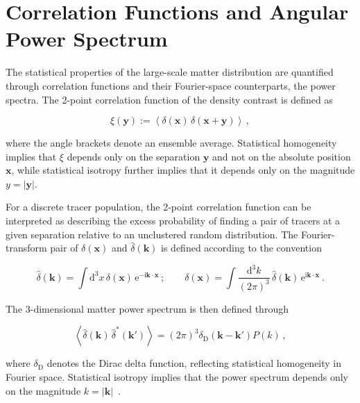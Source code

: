 \section{Correlation Functions and Angular Power Spectrum}\label{sec:correlation_functions}
The statistical properties of the large-scale matter distribution are quantified through 
correlation functions and their Fourier-space counterparts, the power spectra. 
The 2-point correlation function of the density contrast
is defined as

\begin{equation}
    \xi(\mathbf{y})
    := \left\langle
    \delta(\mathbf{x})\,\delta(\mathbf{x}+\mathbf{y})
    \right\rangle \,,
\end{equation}

where the angle brackets denote an ensemble average. Statistical
homogeneity implies that $\xi$ depends only on the separation
$\mathbf{y}$ and not on the absolute position $\mathbf{x}$, while
statistical isotropy further implies that it depends only on the
magnitude $y = |\mathbf{y}|$. 

For a discrete tracer population,
the 2-point correlation function can be interpreted as
describing the excess probability of finding a pair of tracers at a
given separation relative to an unclustered random distribution.
The Fourier-transform pair of $\delta(\mathbf{x})$ and 
$\hat{\delta}(\mathbf{k})$ is defined according to the convention

\begin{equation}
    \hat{\delta}(\mathbf{k})
    =
    \int \mathrm{d}^3 x\,
    \delta(\mathbf{x})\,
    \mathrm{e}^{-\mathrm{i}\mathbf{k}\cdot\mathbf{x}} \,; \qquad
    \delta(\mathbf{x})
    =
    \int \frac{\mathrm{d}^3 k}{(2\pi)^3}\,
    \hat{\delta}(\mathbf{k})\,
    \mathrm{e}^{\mathrm{i}\mathbf{k}\cdot\mathbf{x}} \,.
\end{equation}

The 3-dimensional matter power spectrum is then defined through

\begin{equation}
    \left\langle
    \hat{\delta}(\mathbf{k})\,
    \hat{\delta}^{*}(\mathbf{k}')
    \right\rangle
    =
    (2\pi)^3
    \delta_{\mathrm{D}}(\mathbf{k}-\mathbf{k}')
    P(k) \,,
\end{equation}

where $\delta_{\mathrm{D}}$ denotes the Dirac delta function, reflecting statistical homogeneity in Fourier space.
Statistical isotropy implies that the power spectrum depends only on the magnitude
$k = |\mathbf{k}|$~\cite{BartelmannSchneider_2001}.

